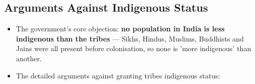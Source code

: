 \subsection{Arguments Against Indigenous Status}

\begin{CriticalPoint}
\begin{itemize}
\item The government's core objection: \textbf{no population in India is less indigenous than the tribes} --- Sikhs, Hindus, Muslims, Buddhists and Jains were all present before colonisation, so none is 'more indigenous' than another.
\item The detailed arguments against granting tribes indigenous status:
\end{itemize}
\end{CriticalPoint}

